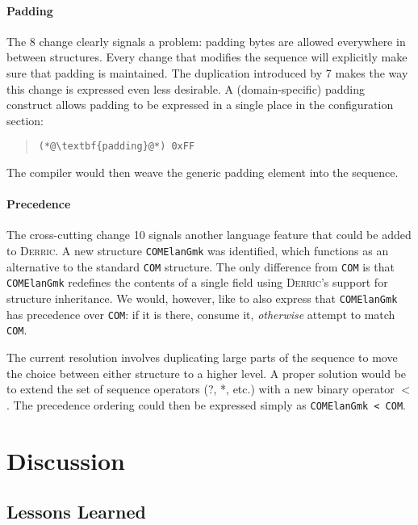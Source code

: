 \documentclass[a4paper]{llncs}
\def\derric{\textsc{Derric}\xspace}
\newcommand{\JPEG}{\textsmaller{JPEG}\xspace}
\def\identifier#1{\texttt{#1}}
\begin{document}
\paragraph{Padding}
The \JPEG 8 change clearly signals a problem: padding bytes are allowed everywhere in between structures.
Every change that modifies the sequence will explicitly make sure that padding is maintained.
The duplication introduced by \JPEG 7 makes the way this change is expressed even less desirable.
A (domain-specific) padding construct allows padding to be expressed in a single place  in the configuration section:
\begin{quote}
\begin{lstlisting}[language=derric]
(*@\textbf{padding}@*) 0xFF
\end{lstlisting}
\end{quote}
The compiler would then weave the generic padding element into the sequence.

\paragraph{Precedence}

The cross-cutting change \JPEG 10 signals another language feature that could be added to \derric.
A new structure \identifier{COMElanGmk} was identified, which functions as an alternative to the standard \identifier{COM} structure.
The only difference from \identifier{COM} is that \identifier{COMElanGmk} redefines the contents of a single field using \derric's support for structure inheritance.
We would, however, like to also express that \identifier{COMElanGmk} has precedence over \identifier{COM}: if it is there, consume it, \textit{otherwise} attempt to match \identifier{COM}.

The current resolution involves duplicating large parts of the sequence to move the choice between either structure to a higher level.
A proper solution would be to extend the set of sequence operators (?, *, etc.) with a new binary operator $<$.
The precedence ordering could then be expressed simply as \lstinline[language=derric]{COMElanGmk < COM}.

\section{Discussion\label{sect:discussion}}

\subsection{Lessons Learned}
\end{document}
